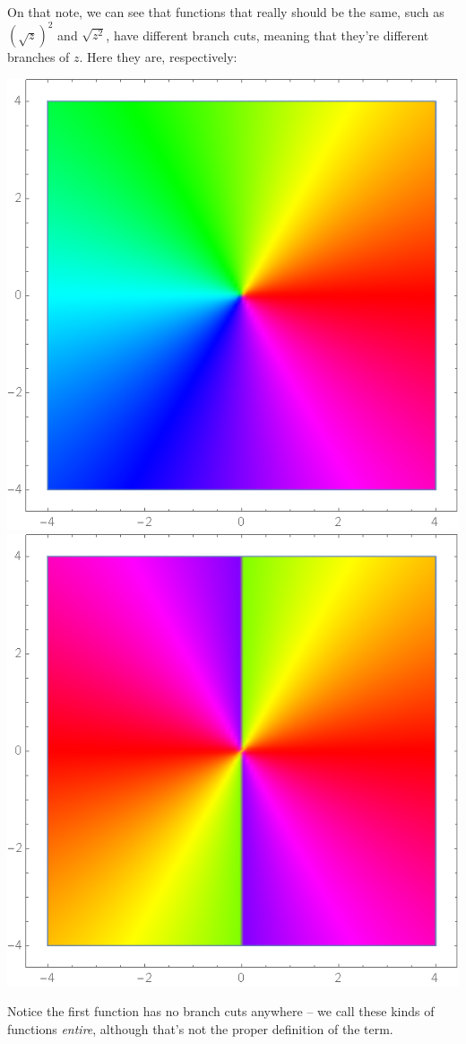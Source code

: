 \documentclass[12pt]{scrartcl}
\begin{document}
On that note, we can see that functions that really should be the same, such as $(\sqrt{z})^2$ and $\sqrt{z^2}$, have different branch cuts, meaning that they're different branches of $z$. Here they are, respectively:
\begin{center}
	\includegraphics[scale=0.27]{images/sqrtzsqr1.png}
	\includegraphics[scale=0.27]{images/sqrtzsqr2.png}
\end{center}
Notice the first function has no branch cuts anywhere -- we call these kinds of functions \textit{entire}, although that's not the proper definition of the term.
\end{document}
